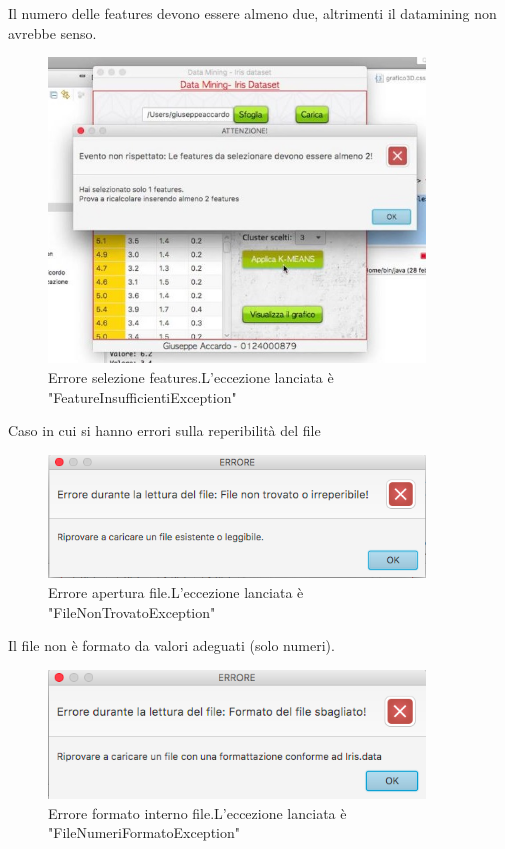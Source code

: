 \documentclass[a4paper, oneside]{book}
\begin{document}
Il numero delle features devono essere almeno due, altrimenti il datamining non avrebbe senso.
\begin{figure}[htp]
\centering
\includegraphics[width=10cm]{26.bmp}
\caption{Errore selezione features.L'eccezione lanciata è "FeatureInsufficientiException"}
\label{fig:sel feu}
\end{figure}

\newpage
Caso in cui si hanno errori sulla reperibilità del file
\begin{figure}[htp]
\centering
\includegraphics[width=10cm]{30.png}
\caption{Errore apertura file.L'eccezione lanciata è "FileNonTrovatoException"}
\label{fig:sel feu}
\end{figure}
Il file non è formato da valori adeguati (solo numeri).
\begin{figure}[htp]
\centering
\includegraphics[width=10cm]{31.png}
\caption{Errore formato interno file.L'eccezione lanciata è "FileNumeriFormatoException"}
\label{fig:sel feu}
\end{figure}
\end{document}
